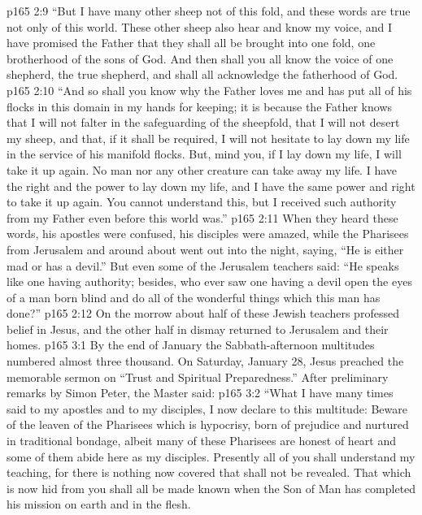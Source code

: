 \vs p165 2:9 \textcolor{ubdarkred}{“But I have many other sheep not of this fold, and these words are true not only of this world. These other sheep also hear and know my voice, and I have promised the Father that they shall all be brought into one fold, one brotherhood of the sons of God. And then shall you all know the voice of one shepherd, the true shepherd, and shall all acknowledge the fatherhood of God.}
\vs p165 2:10 \textcolor{ubdarkred}{“And so shall you know why the Father loves me and has put all of his flocks in this domain in my hands for keeping; it is because the Father knows that I will not falter in the safeguarding of the sheepfold, that I will not desert my sheep, and that, if it shall be required, I will not hesitate to lay down my life in the service of his manifold flocks. But, mind you, if I lay down my life, I will take it up again. No man nor any other creature can take away my life. I have the right and the power to lay down my life, and I have the same power and right to take it up again. You cannot understand this, but I received such authority from my Father even before this world was.”}\plusone
\pc \vs p165 2:11 When they heard these words, his apostles were confused, his disciples were amazed, while the Pharisees from Jerusalem and around about went out into the night, saying, “He is either mad or has a devil.” But even some of the Jerusalem teachers said: “He speaks like one having authority; besides, who ever saw one having a devil open the eyes of a man born blind and do all of the wonderful things which this man has done?”
\vs p165 2:12 On the morrow about half of these Jewish teachers professed belief in Jesus, and the other half in dismay returned to Jerusalem and their homes.
\vs p165 3:1 By the end of January the Sabbath\hyp{}afternoon multitudes numbered almost three thousand. On Saturday, January 28, Jesus preached the memorable sermon on “Trust and Spiritual Preparedness.” After preliminary remarks by Simon Peter, the Master said:
\pc \vs p165 3:2 \textcolor{ubdarkred}{“What I have many times said to my apostles and to my disciples, I now declare to this multitude: Beware of the leaven of the Pharisees which is hypocrisy, born of prejudice and nurtured in traditional bondage, albeit many of these Pharisees are honest of heart and some of them abide here as my disciples. Presently all of you shall understand my teaching, for there is nothing now covered that shall not be revealed. That which is now hid from you shall all be made known when the Son of Man has completed his mission on earth and in the flesh.}

